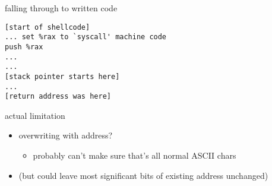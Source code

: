 \begin{frame}[fragile]{falling through to written code}
\begin{Verbatim}[fontsize=\small]
[start of shellcode]
... set %rax to `syscall' machine code
push %rax
...
...
[stack pointer starts here]
...
[return address was here]
\end{Verbatim}
\end{frame}

\begin{frame}{actual limitation}
    \begin{itemize}
    \item overwriting with address? 
        \begin{itemize}
        \item probably can't make sure that's all normal ASCII chars
        \end{itemize}
    \item (but could leave most significant bits of existing address unchanged)
    \end{itemize}
\end{frame}


